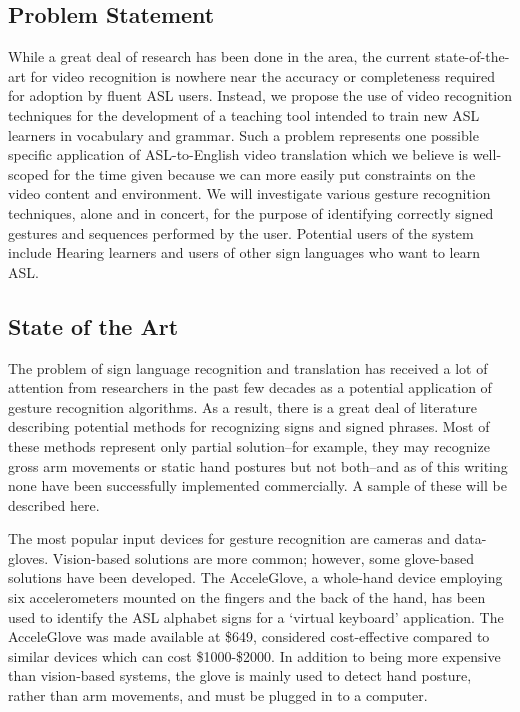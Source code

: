 \documentclass[12pt]{article}
\begin{document}
\subsection{Problem Statement}
While a great deal of research has been done in the area, the current state-of-the-art for video recognition is nowhere near the accuracy or completeness required for adoption by fluent ASL users. Instead, we propose the use of video recognition techniques for the development of a teaching tool intended to train new ASL learners in vocabulary and grammar. Such a problem represents one possible specific application of ASL-to-English video translation which we believe is well-scoped for the time given because we can more easily put constraints on the video content and environment. We will investigate various gesture recognition techniques, alone and in concert, for the purpose of identifying correctly signed gestures and sequences performed by the user. Potential users of the system include Hearing learners and users of other sign languages who want to learn ASL.

\subsection{State of the Art}
The problem of sign language recognition and translation has received a lot of attention from researchers in the past few decades as a potential application of gesture recognition algorithms. As a result, there is a great deal of literature describing potential methods for recognizing signs and signed phrases. Most of these methods represent only partial solution--for example, they may recognize gross arm movements or static hand postures but not both--and as of this writing none have been successfully implemented commercially. A sample of these will be described here.

The most popular input devices for gesture recognition are cameras and data-gloves. Vision-based solutions are more common; however, some glove-based solutions have been developed. The AcceleGlove, \cite{Accele} a whole-hand device employing six accelerometers mounted on the fingers and the back of the hand, has been used to identify the ASL alphabet signs for a ‘virtual keyboard’ application. The AcceleGlove was made available at \$649, considered cost-effective compared to similar devices which can cost \$1000-\$2000. \cite{Accele2} In addition to being more expensive than vision-based systems, the glove is mainly used to detect hand posture, rather than arm movements, and must be plugged in to a computer.
\end{document}
